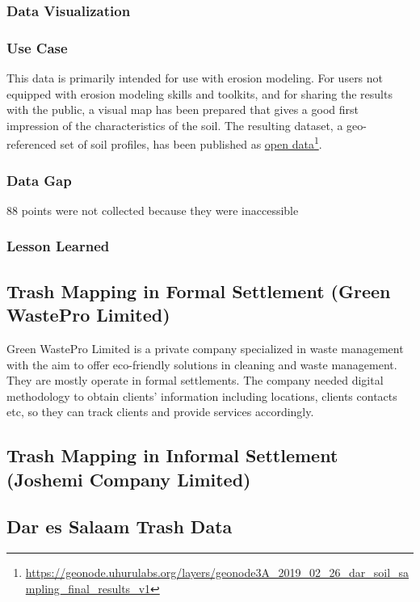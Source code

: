 \documentclass[a4paper,12pt,twoside]{article}
\begin{document}
\subsubsection{Data Visualization}

\subsubsection{Use Case}
This data is primarily intended for use with erosion modeling. For users not equipped with erosion modeling skills and toolkits, and for sharing the results with the public, a visual map has been prepared that gives a good first impression of the characteristics of the soil.
The resulting dataset, a geo-referenced set of soil profiles, has been published as \href{https://geonode.uhurulabs.org/layers/geonode3A_2019_02_26_dar_soil_sampling_final_results_v1}{open data}\footnote{\url{https://geonode.uhurulabs.org/layers/geonode3A_2019_02_26_dar_soil_sampling_final_results_v1}}.

\subsubsection{Data Gap}
88 points were not collected because they were inaccessible

\subsubsection{Lesson Learned}

\newpage
\subsection{Trash Mapping in Formal Settlement (Green WastePro Limited)}
Green WastePro Limited is a private company specialized in waste management with the aim to offer eco-friendly solutions in cleaning and waste management. They are mostly operate in formal settlements. The company needed digital methodology to obtain clients’ information including locations, clients contacts etc, so they can track clients and provide services accordingly.

\newpage
\subsection{Trash Mapping in Informal Settlement (Joshemi Company Limited)}

\newpage
\subsection{Dar es Salaam Trash Data}
\end{document}
